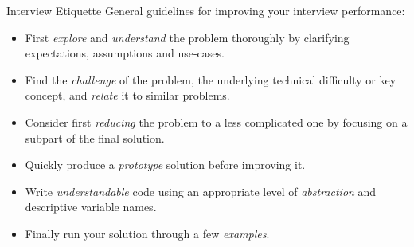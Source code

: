 \documentclass{cognito}
\begin{document}


\begin{answer}{Interview Etiquette}
	General guidelines for improving your interview performance:
	\begin{itemize}
		\item First {\it explore} and {\it understand} the problem thoroughly by clarifying
			expectations, assumptions and use-cases.
		\item Find the {\it challenge} of the problem, the underlying technical difficulty or key concept,
			and {\it relate} it to similar problems.
		\item Consider first {\it reducing} the problem to a less complicated one by focusing on a subpart of the final solution.
		\item Quickly produce a {\it prototype} solution before improving it.
		\item Write {\it understandable} code using an appropriate level of {\it abstraction} and descriptive variable names.
		\item Finally run your solution through a few {\it examples}.
	\end{itemize}
\end{answer}
\end{document}
